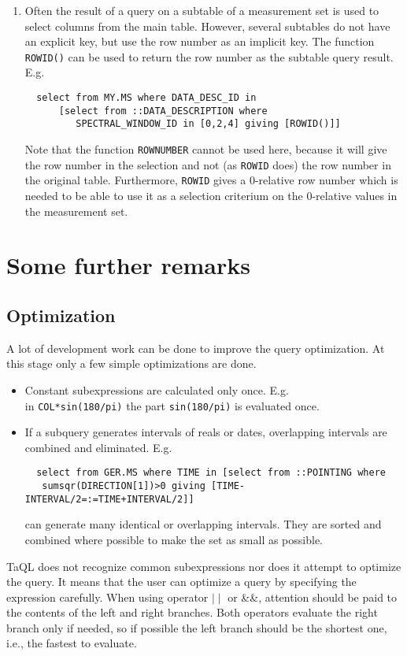 \begin{enumerate}
\item
Often the result of a query on a subtable of a measurement set is
used to select columns from the main table. However, several
subtables do not have an explicit key, but use the row number as
an implicit key. The function \texttt{ROWID()} can be used to
return the row number as the subtable query result. E.g.
\begin{verbatim}
  select from MY.MS where DATA_DESC_ID in
      [select from ::DATA_DESCRIPTION where
         SPECTRAL_WINDOW_ID in [0,2,4] giving [ROWID()]] 
\end{verbatim}
Note that the function \texttt{ROWNUMBER} cannot be used here,
because it will give the row number in the selection and not
(as \texttt{ROWID} does) the row number in the original table.
Furthermore, \texttt{ROWID} gives a 0-relative row number which is
needed to be able to use it as a selection criterium on the 0-relative
values in the measurement set.
\end{enumerate}


\section{Some further remarks}
\subsection{Optimization}
A lot of development work can be done to improve the query optimization.
At this stage only a few simple optimizations are done.
\begin{itemize}
\item Constant subexpressions are calculated only once. E.g.
\\in \texttt{COL*sin(180/pi)} the part \texttt{sin(180/pi)} is
evaluated once.
\item If a subquery generates intervals of reals or dates, overlapping
intervals are combined and eliminated. E.g.
\begin{verbatim}
  select from GER.MS where TIME in [select from ::POINTING where
   sumsqr(DIRECTION[1])>0 giving [TIME-INTERVAL/2=:=TIME+INTERVAL/2]]
\end{verbatim}
can generate many identical or overlapping intervals. They are
sorted and combined where possible to make the set as small as possible.
\end{itemize}

TaQL does not recognize common subexpressions nor does it attempt to
optimize the query.
It means that the user can optimize a query by specifying the expression
carefully. When using operator $\mid\mid$ or \&\&,
attention should be
paid to the contents of the left and right branches. Both operators
evaluate the right branch only if needed, so if possible the left branch
should be the shortest one, i.e., the fastest to evaluate.

